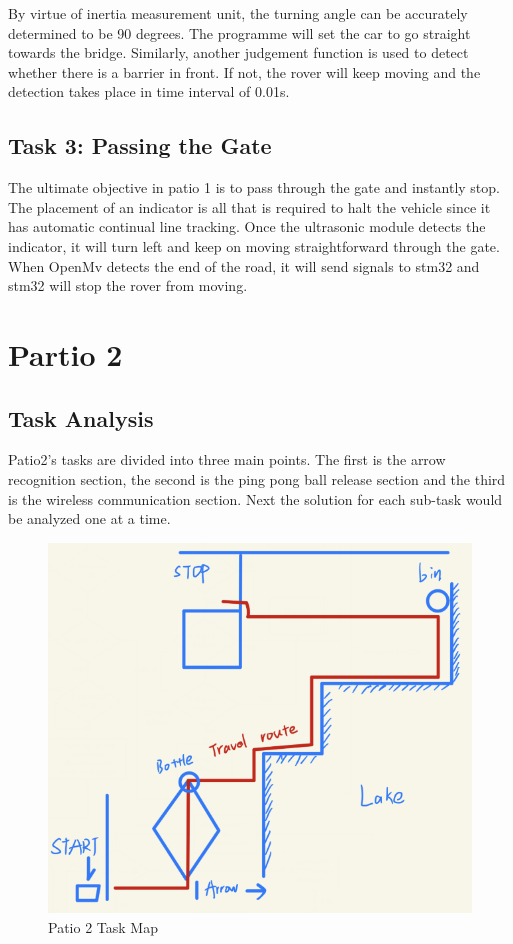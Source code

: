\documentclass[12pt, a4paper, oneside]{report}
\begin{document}
By virtue of inertia measurement unit, the turning angle can be accurately determined to be 90 degrees. The programme will set the car to go straight towards the bridge. Similarly, another judgement function is used to detect whether there is a barrier in front. If not, the rover will keep moving and the detection takes place in time interval of 0.01s.

\subsection{Task 3: Passing the Gate}
The ultimate objective in patio 1 is to pass through the gate and instantly stop. The placement of an indicator is all that is required to halt the vehicle since it has automatic continual line tracking. Once the ultrasonic module detects the indicator, it will turn left and keep on moving straightforward through the gate. When OpenMv detects the end of the road, it will send signals to stm32 and stm32 will stop the rover from moving.




\newpage
\section{Partio 2}
\subsection{Task Analysis}
Patio2's tasks are divided into three main points. The first is the arrow recognition section, the second is the ping pong ball release section and the third is the wireless communication section. Next the solution for each sub-task would be analyzed one at a time.
\begin{figure}[!h]
    \centering
    \includegraphics[scale=0.9]{pic/Patio 2/pa2-1.png}     
    \caption{Patio 2 Task Map}
    \label{pa2-1}
\end{figure}
\end{document}
